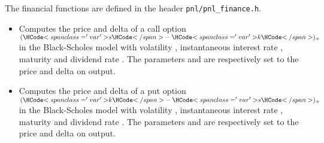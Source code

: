 The financial functions are defined in the header \verb!pnl/pnl_finance.h!.\\

\begin{itemize}
\item
  \sshortdescribe Computes the price and delta of a call option $(\var{s} -
  \var{k})_+$ in the Black-Scholes model with volatility ,
  instantaneous interest rate , maturity  and dividend rate
  . The parameters  and  are respectively
  set to the price and delta on output.

\item
  \sshortdescribe Computes the price and delta of a put option $(\var{k} - 
  \var{s})_+$ in the Black-Scholes model with volatility ,
  instantaneous interest rate , maturity  and dividend rate
  .  The parameters  and  are respectively
  set to the price and delta on output.

\end{itemize}


